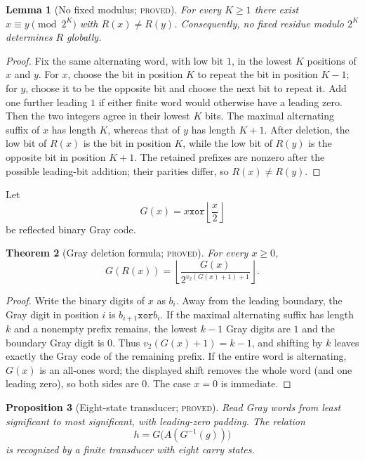 \documentclass[11pt]{article}
\newtheorem{theorem}{Theorem}[section]
\newtheorem{proposition}[theorem]{Proposition}
\newtheorem{lemma}[theorem]{Lemma}
\theoremstyle{definition}
\newcommand{\vTwo}{v_2}
\newcommand{\xor}{\mathbin{\mathtt{xor}}}
\newcommand{\proved}{\textsc{proved}}
\begin{document}
\begin{lemma}[No fixed modulus; \proved]\label{lem:no-fixed-modulus}
For every $K\ge1$ there exist $x\equiv y\pmod{2^K}$ with $R(x)\ne R(y)$.
Consequently, no fixed residue modulo $2^K$ determines $R$ globally.
\end{lemma}

\begin{proof}
Fix the same alternating word, with low bit $1$, in the lowest $K$ positions
of $x$ and $y$.
For $x$, choose the bit in position $K$ to repeat the bit in position $K-1$;
for $y$, choose it to be the opposite bit and choose the next bit to repeat
it.  Add one further leading $1$ if either finite word would otherwise have a
leading zero.  Then the two integers agree in their lowest $K$ bits.  The
maximal alternating suffix of $x$ has length $K$, whereas that of $y$ has
length $K+1$.  After deletion, the low bit of $R(x)$ is the bit in position
$K$, while the low bit of $R(y)$ is the opposite bit in position $K+1$.
The retained prefixes are nonzero after the possible leading-bit addition;
their parities differ, so $R(x)\ne R(y)$.
\end{proof}

Let
\[
  G(x)=x\xor\left\lfloor\frac{x}{2}\right\rfloor
\]
be reflected binary Gray code.

\begin{theorem}[Gray deletion formula; \proved]\label{thm:gray}
For every $x\ge0$,
\[
 \boxed{G(R(x))=
 \left\lfloor
 \frac{G(x)}{2^{\vTwo(G(x)+1)+1}}
 \right\rfloor.}
\]
\end{theorem}

\begin{proof}
Write the binary digits of $x$ as $b_i$.  Away from the leading boundary, the
Gray digit in position $i$ is $b_{i+1}\xor b_i$.  If the maximal alternating
suffix has length $k$ and a nonempty prefix remains, the lowest $k-1$ Gray
digits are $1$ and the boundary Gray digit is $0$.  Thus
$\vTwo(G(x)+1)=k-1$, and shifting by $k$ leaves exactly the Gray code of the
remaining prefix.  If the entire word is alternating, $G(x)$ is an all-ones
word; the displayed shift removes the whole word (and one leading zero), so
both sides are $0$.  The case $x=0$ is immediate.
\end{proof}

\begin{proposition}[Eight-state transducer; \proved]
Read Gray words from least significant to most significant, with leading-zero
padding.  The relation
\[
  h=G\bigl(A(G^{-1}(g))\bigr)
\]
is recognized by a finite transducer with eight carry states.
\end{proposition}
\end{document}
